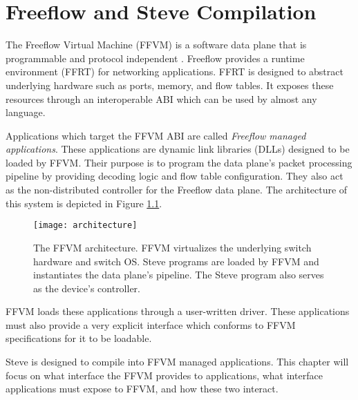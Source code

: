 \chapter{Freeflow and Steve Compilation} \label{ch:flowpath}

The Freeflow Virtual Machine (FFVM) is a software data plane that is programmable and protocol independent \cite{freeflow_software}. Freeflow provides a runtime environment (FFRT) for networking applications. FFRT is designed to abstract underlying hardware such as ports, memory, and flow tables. It exposes these resources through an interoperable ABI which can be used by almost any language. 

Applications which target the FFVM ABI are called \emph{Freeflow managed applications}.
These applications are dynamic link libraries (DLLs) designed to be loaded by FFVM.
Their purpose is to program the data plane's packet processing pipeline by providing decoding logic and flow table configuration. They also act as the non-distributed controller for the Freeflow data plane. The architecture of this system is depicted in Figure \ref{fig:architecture}.

\begin{figure}[ht]
\centering
\texttt{[image: architecture]}
\caption{The FFVM architecture. FFVM virtualizes the underlying switch hardware and switch OS. Steve programs are loaded by FFVM and instantiates the data plane's pipeline. The Steve program also serves as the device's controller.}
\label{fig:architecture}
\end{figure}

FFVM loads these applications through a user-written driver. These applications must also provide a very explicit interface which conforms to FFVM specifications for it to be loadable.

Steve is designed to compile into FFVM managed applications. This chapter will focus on what interface the FFVM provides to applications, what interface applications must expose to FFVM, and how these two interact.



